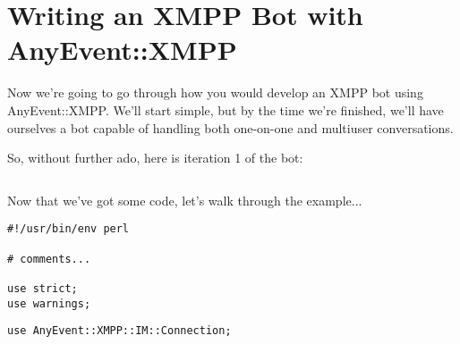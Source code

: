 \part{Writing an XMPP Bot with AnyEvent::XMPP}

\newpage
Now we're going to go through how you would develop an XMPP bot
using AnyEvent::XMPP.  We'll start simple, but by the time we're
finished, we'll have ourselves a bot capable of handling both one-on-one
and multiuser conversations.

\pause
So, without further ado, here is iteration 1 of the bot:

\pause

\begin{framed}
\inputminted{perl}{examples/bare-bot.pl}
\end{framed}

\pause

Now that we've got some code, let's walk through the example...

\newpage

\begin{framed}
\begin{verbatim}
#!/usr/bin/env perl

# comments...

use strict;
use warnings;
\end{verbatim}
\end{framed}

\pause
\begin{comment}
You should be familiar with this part already!
\end{comment}

\begin{framed}
\begin{verbatim}
use AnyEvent::XMPP::IM::Connection;
\end{verbatim}
\end{framed}

\pause
\begin{comment}
This statement loads the AnyEvent::XMPP::IM::Connection class.  Normally I wouldn't
waste my time explaining a use statement, but I just want to make sure you know there
are three connection classes in AnyEvent::XMPP:

\begin{description}
\item[AnyEvent::XMPP::Connection] Simple connections; no bells and whistles.
\item[AnyEvent::XMPP::IM::Connection] Provides more advanced events (message, contact_request_subscribe), initial presence, roster.
\item[AnyEvent::XMPP::Client] Manages multiple connections.
\end{description}
\end{comment}

